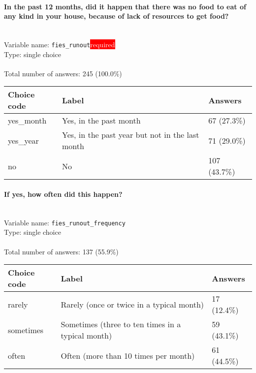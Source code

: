 \documentclass[11.5pt, a4paper]{scrartcl}
\begin{document}
\paragraph{In the past 12 months, did it happen that there was no food to eat of any kind in your house, because of lack of resources to get food? }
\  \\Variable name: \texttt{fies\_runout}\hfill\colorbox{red}{\small{\textcolor{white}{required}}}\\
 Type: single choice\\
\\Total number of answers: 245 (100.0\%)
\\[0.2em] \begin{tabular}{p{4cm}|p{8cm}|p{3cm}}
Choice code & Label & Answers \\
\hline
yes\_month & Yes, in the past month& \cellcolor{color1}67 (27.3\%)\\
\cellcolor{mygray} yes\_year & \cellcolor{mygray}Yes, in the past year but not in the last month & \cellcolor{color1}71 (29.0\%)\\
no & No& \cellcolor{color2}107 (43.7\%)\\
\end{tabular}
\paragraph{If yes, how often did this happen? }
\  \\Variable name: \texttt{fies\_runout\_frequency}\\
Type: single choice\\
\\Total number of answers: 137 (55.9\%)
\\[0.2em] \begin{tabular}{p{4cm}|p{8cm}|p{3cm}}
Choice code & Label & Answers \\
\hline
rarely & Rarely (once or twice in a typical month)& \cellcolor{color0}17 (12.4\%)\\
\cellcolor{mygray} sometimes & \cellcolor{mygray}Sometimes (three to ten times in a typical month) & \cellcolor{color2}59 (43.1\%)\\
often & Often (more than 10 times per month)& \cellcolor{color2}61 (44.5\%)\\
\end{tabular}
\end{document}
